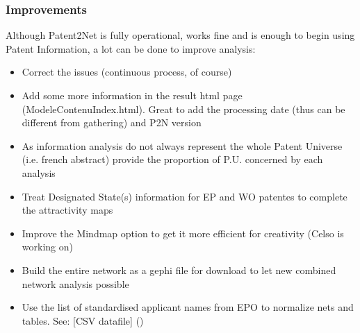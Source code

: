 \documentclass[letterpaper,10pt,english]{sphinxmanual}
\begin{document}
\subsubsection{Improvements}
\label{\detokenize{todo:improvements}}
Although Patent2Net is fully operational, works fine and is enough to begin using Patent Information, a lot can be done to improve analysis:
\begin{itemize}
\item {} 
Correct the issues (continuous process, of course)

\item {} 
Add some more information in the result html page (ModeleContenuIndex.html). Great to add the processing date (thus can be different from gathering) and P2N version

\item {} 
As information analysis do not always represent the whole Patent Universe (i.e. french abstract) provide the proportion of P.U. concerned by each analysis

\item {} 
Treat Designated State(s) information for EP and WO patentes to complete the attractivity maps

\item {} 
Improve the Mindmap option to get it more efficient for creativity (Celso is working on)

\item {} 
Build the entire network as a gephi file for download to let new combined network analysis possible

\item {} 
Use the list of standardised applicant names from EPO to normalize nets and tables. See: {[}CSV datafile{]} ()

\end{itemize}
\end{document}
